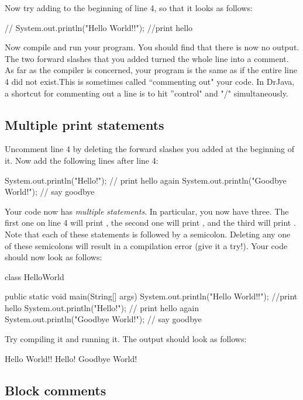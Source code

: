 Now try adding \ic{//} to the beginning of line 4, so that it looks as follows:
\begin{code}
//        System.out.println("Hello World!!"); //print hello
\end{code}
Now compile and run your program. You should find that there is now no output. The two forward slashes that you added turned the whole line into a comment. As far as the compiler is concerned, your program is the same
as if the entire line 4 did not exist.This is sometimes called ``commenting out" your code. In DrJava, a shortcut for commenting out a line is to hit ''control" and "/" simultaneously.

\subsection{Multiple print statements}

Uncomment line 4 by deleting the forward slashes you added at the beginning of it.
Now add the following lines after line 4:
\begin{code}
System.out.println("Hello!"); // print hello again
System.out.println("Goodbye World!"); // say goodbye
\end{code}
Your code now has \emph{multiple statements}. In particular, you now have three. The first one on line 4 will print
, the second one will print , and the third will print .
Note that each of these statements is followed by a semicolon.
Deleting any one of these semicolons will result in a compilation error (give it a try!).
Your code should now look as follows:
\begin{code}
class HelloWorld {
    
    public static void main(String[] args) {
        System.out.println("Hello World!!"); //print hello
        System.out.println("Hello!"); // print hello again
        System.out.println("Goodbye World!"); // say goodbye
    }
    
}
\end{code}
Try compiling it and running it. The output should look as follows:
\begin{code}
Hello World!!
Hello!
Goodbye World!
\end{code}

\subsection{Block comments}

